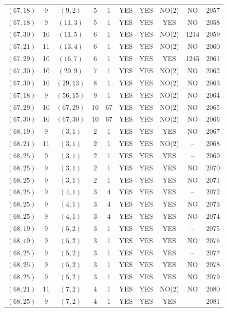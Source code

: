 \begin{longtable}{|c|c|c|c|c|c|c|c|c|c|}
$(67, 18)$ & 9 & $(9, 2)$ & 5 & 1 & YES & YES & NO(2) & NO & 2057\\
$(67, 18)$ & 9 & $(11, 3)$ & 5 & 1 & YES & YES & YES & NO & 2058\\
$(67, 30)$ & 10 & $(11, 5)$ & 6 & 1 & YES & YES & NO(2) & 1214 & 2059\\
$(67, 21)$ & 11 & $(13, 4)$ & 6 & 1 & YES & YES & NO(2) & NO & 2060\\
$(67, 29)$ & 10 & $(16, 7)$ & 6 & 1 & YES & YES & YES & 1245 & 2061\\
$(67, 30)$ & 10 & $(20, 9)$ & 7 & 1 & YES & YES & NO(2) & NO & 2062\\
$(67, 30)$ & 10 & $(29, 13)$ & 8 & 1 & YES & YES & NO(2) & NO & 2063\\
$(67, 18)$ & 9 & $(56, 15)$ & 9 & 1 & YES & YES & NO(2) & NO & 2064\\
$(67, 29)$ & 10 & $(67, 29)$ & 10 & 67 & YES & YES & NO(2) & NO & 2065\\
$(67, 30)$ & 10 & $(67, 30)$ & 10 & 67 & YES & YES & NO(2) & NO & 2066\\
$(68, 19)$ & 9 & $(3, 1)$ & 2 & 1 & YES & YES & YES & NO & 2067\\
$(68, 21)$ & 11 & $(3, 1)$ & 2 & 1 & YES & YES & NO(2) & -- & 2068\\
$(68, 25)$ & 9 & $(3, 1)$ & 2 & 1 & YES & YES & YES & -- & 2069\\
$(68, 25)$ & 9 & $(3, 1)$ & 2 & 1 & YES & YES & YES & NO & 2070\\
$(68, 25)$ & 9 & $(3, 1)$ & 2 & 1 & YES & YES & YES & NO & 2071\\
$(68, 25)$ & 9 & $(4, 1)$ & 3 & 4 & YES & YES & YES & -- & 2072\\
$(68, 25)$ & 9 & $(4, 1)$ & 3 & 4 & YES & YES & YES & NO & 2073\\
$(68, 25)$ & 9 & $(4, 1)$ & 3 & 4 & YES & YES & YES & NO & 2074\\
$(68, 19)$ & 9 & $(5, 2)$ & 3 & 1 & YES & YES & YES & -- & 2075\\
$(68, 19)$ & 9 & $(5, 2)$ & 3 & 1 & YES & YES & YES & NO & 2076\\
$(68, 25)$ & 9 & $(5, 2)$ & 3 & 1 & YES & YES & YES & -- & 2077\\
$(68, 25)$ & 9 & $(5, 2)$ & 3 & 1 & YES & YES & YES & NO & 2078\\
$(68, 25)$ & 9 & $(5, 2)$ & 3 & 1 & YES & YES & YES & NO & 2079\\
$(68, 21)$ & 11 & $(7, 2)$ & 4 & 1 & YES & YES & NO(2) & NO & 2080\\
$(68, 25)$ & 9 & $(7, 2)$ & 4 & 1 & YES & YES & YES & -- & 2081\\

\end{longtable}
